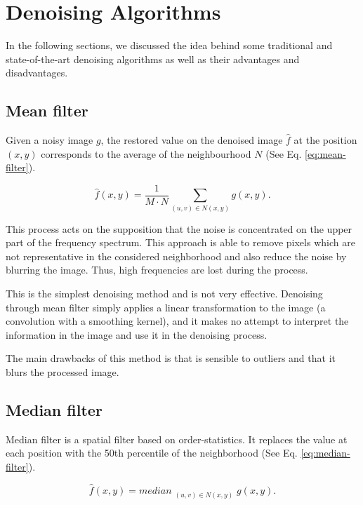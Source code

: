 \section{Denoising Algorithms} \label{sc:state-of-the-art}
In the following sections, we discussed the idea behind some traditional and state-of-the-art denoising algorithms as well as their advantages and disadvantages.

\subsection{Mean filter}

Given a noisy image $g$, the restored value on the denoised image $\hat{f}$ at the position $(x, y)$ corresponds to the average of the neighbourhood $N$ (See Eq. \ref{eq:mean-filter}).

\begin{equation}
	\hat{f}(x, y) = \frac{1}{M\cdot N}\sum_{(u, v) \in N(x, y)}{g(x, y)}.
    \label{eq:mean-filter}
\end{equation}

This process acts on the supposition that the noise is concentrated on the upper part of the frequency spectrum. This approach is able to remove pixels which are not representative in the considered neighborhood and also reduce the noise by blurring the image. Thus, high frequencies are lost during the process.

This is the simplest denoising method and is not very effective. Denoising through mean filter simply applies a linear transformation to the image (a convolution with a smoothing kernel), and it makes no attempt to interpret the information in the image and use it in the denoising process.

The main drawbacks of this method is that is sensible to outliers and that it blurs the processed image.

\subsection{Median filter}

Median filter is a spatial filter based on order-statistics. It replaces the value at each position with the 50th percentile of the neighborhood (See Eq. \ref{eq:median-filter}). 

\begin{equation}
	\hat{f}(x, y) = {median}_{\substack{(u, v) \in N(x, y)}}{g(x, y)}.
    \label{eq:median-filter}
\end{equation}

